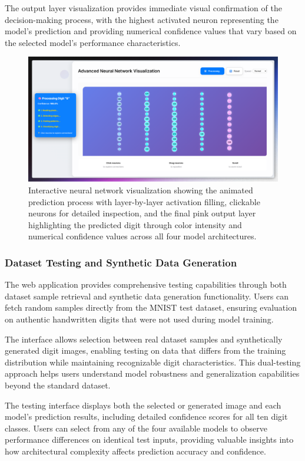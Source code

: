 \documentclass[11pt,a4paper]{report}
\begin{document}
The output layer visualization provides immediate visual confirmation of the decision-making process, with the highest activated neuron representing the model's prediction and providing numerical confidence values that vary based on the selected model's performance characteristics.

\begin{figure}[H]
\centering
\includegraphics[width=\textwidth]{digit_recognizer_neural_visualization.png}
\caption{Interactive neural network visualization showing the animated prediction process with layer-by-layer activation filling, clickable neurons for detailed inspection, and the final pink output layer highlighting the predicted digit through color intensity and numerical confidence values across all four model architectures.}
\label{fig:digit_neural_viz}
\end{figure}

\subsubsection{Dataset Testing and Synthetic Data Generation}

The web application provides comprehensive testing capabilities through both dataset sample retrieval and synthetic data generation functionality. Users can fetch random samples directly from the MNIST test dataset, ensuring evaluation on authentic handwritten digits that were not used during model training.

The interface allows selection between real dataset samples and synthetically generated digit images, enabling testing on data that differs from the training distribution while maintaining recognizable digit characteristics. This dual-testing approach helps users understand model robustness and generalization capabilities beyond the standard dataset.

The testing interface displays both the selected or generated image and each model's prediction results, including detailed confidence scores for all ten digit classes. Users can select from any of the four available models to observe performance differences on identical test inputs, providing valuable insights into how architectural complexity affects prediction accuracy and confidence.
\end{document}
